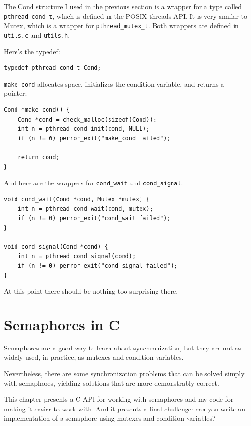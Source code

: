 \documentclass[12pt]{book}
\begin{document}
{The Cond structure I used in the previous section is a wrapper
for a type called \verb"pthread_cond_t", which is defined in the POSIX
threads API.  It is very similar to Mutex, which is a wrapper for
\verb"pthread_mutex_t".  Both wrappers are defined in {\tt utils.c} and
{\tt utils.h}.

Here's the typedef:

\begin{verbatim}
typedef pthread_cond_t Cond;
\end{verbatim}

\verb"make_cond" allocates space, initializes the condition variable,
and returns a pointer:

\begin{verbatim}
Cond *make_cond() {
    Cond *cond = check_malloc(sizeof(Cond)); 
    int n = pthread_cond_init(cond, NULL);
    if (n != 0) perror_exit("make_cond failed");
 
    return cond;
}
\end{verbatim}

And here are the wrappers for \verb"cond_wait" and \verb"cond_signal".

\begin{verbatim}
void cond_wait(Cond *cond, Mutex *mutex) {
    int n = pthread_cond_wait(cond, mutex);
    if (n != 0) perror_exit("cond_wait failed");
}

void cond_signal(Cond *cond) {
    int n = pthread_cond_signal(cond);
    if (n != 0) perror_exit("cond_signal failed");
}
\end{verbatim}

At this point there should be nothing too surprising there.



\chapter{Semaphores in C}

Semaphores are a good way to learn about synchronization, but
they are not as widely used, in practice, as mutexes and
condition variables.

Nevertheless, there are some synchronization problems that can be
solved simply with semaphores, yielding solutions that are more
demonstrably correct.

This chapter presents a C API for working with semaphores and
my code for making it easier to work with.  And it presents
a final challenge: can you write an implementation of a semaphore
using mutexes and condition variables?

}
\end{document}
